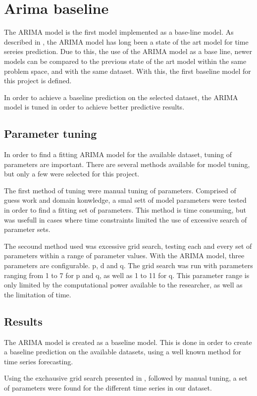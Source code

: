 \section{Arima baseline}
\label{section:Method:Arima}

The ARIMA model is the first model implemented as a base-line model.
As described in , the ARIMA model has long been a state of the art model for time sereies prediction.
Due to this, the use of the ARIMA model as a base line, newer models can be compared to the previous state of the art model within the same problem space,
and with the same dataset.
With this, the first baseline model for this project is defined.


In order to achieve a baseline prediction on the selected dataset, the ARIMA model is tuned in order to achieve better predictive results.

\subsection{Parameter tuning}
\label{section:Method:Arima:Tuning}
In order to find a fitting ARIMA model for the available dataset, tuning of parameters are important.
There are several methods available for model tuning, but only a few were selected for this project.

The first method of tuning were manual tuning of parameters.
Comprised of guess work and domain konwledge, a smal sett of model parameters were tested in order to find a fitting set of parameters.
This method is time consuming, but was usefull in cases where time constraints limited the use of excessive search of parameter sets.

The secound method used was excessive grid search, testing each and every set of parameters within a range of parameter values.
With the ARIMA model, three parameters are configurable. p, d and q.
The grid search was run with parameters ranging from 1 to 7 for p and q, as well as 1 to 11 for q.
This parameter range is only limited by the computational power available to the researcher, as well as the limitation of time.


\subsection{Results}
The ARIMA model is created as a baseline model.
This is done in order to create a baseline prediction on the available datasets, using a well known method for time series forecasting.

Using the exchausive grid search presented in , followed by manual tuning,
a set of parameters were found for the different time series in our dataset.





